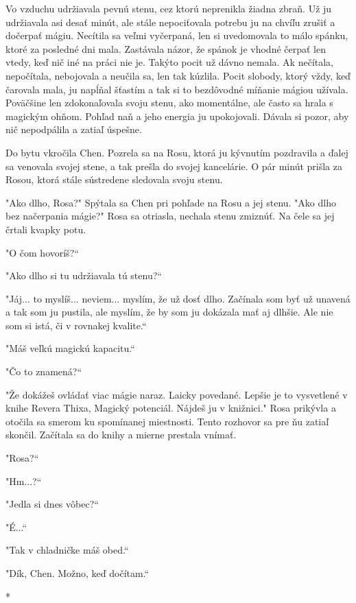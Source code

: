 \documentclass{book}
\begin{document}
Vo vzduchu udržiavala pevnú stenu, cez ktorú neprenikla žiadna zbraň. Už ju udržiavala asi desať minút, ale stále nepociťovala potrebu ju na chvíľu zrušiť a dočerpať mágiu. Necítila sa veľmi vyčerpaná, len si uvedomovala to málo spánku, ktoré za posledné dni mala. Zastávala názor, že spánok je vhodné čerpať len vtedy, keď nič iné na práci nie je. Takýto pocit už dávno nemala. Ak nečítala, nepočítala, nebojovala a neučila sa, len tak kúzlila. Pocit slobody, ktorý vždy, keď čarovala mala, ju napĺňal šťastím a tak si to bezdôvodné míňanie mágiou užívala. Poväčšine len zdokonaľovala svoju stenu, ako momentálne, ale často sa hrala s magickým ohňom. Pohľad naň a jeho energia ju upokojovali. Dávala si pozor, aby nič nepodpálila a zatiaľ úspešne.

Do bytu vkročila Chen. Pozrela sa na Rosu, ktorá ju kývnutím pozdravila a ďalej sa venovala svojej stene, a tak prešla do svojej kancelárie. O pár minút prišla za Rosou, ktorá stále sústredene sledovala svoju stenu.

"$ $Ako dlho, Rosa?"$ $ Spýtala sa Chen pri pohľade na Rosu a jej stenu. "$ $Ako dlho bez načerpania mágie?"$ $ Rosa sa otriasla, nechala stenu zmiznúť. Na čele sa jej črtali kvapky potu.

"$ $O čom hovoríš?“

"$ $Ako dlho si tu udržiavala tú stenu?“

"$ $Jáj... to myslíš... neviem... myslím, že už dosť dlho. Začínala som byť už unavená a tak som ju pustila, ale myslím, že by som ju dokázala mať aj dlhšie. Ale nie som si istá, či v rovnakej kvalite.“

"$ $Máš veľkú magickú kapacitu.“

"$ $Čo to znamená?“

"$ $Že dokážeš ovládať viac mágie naraz. Laicky povedané. Lepšie je to vysvetlené v knihe Revera Thixa, Magický potenciál. Nájdeš ju v knižnici."$ $ Rosa prikývla a otočila sa smerom ku spomínanej miestnosti. Tento rozhovor sa pre ňu zatiaľ skončil. Začítala sa do knihy a mierne prestala vnímať.

"$ $Rosa?“

"$ $Hm...?“

"$ $Jedla si dnes vôbec?“

"$ $É...“

"$ $Tak v chladničke máš obed.“

"$ $Dík, Chen. Možno, keď dočítam.“

\begin{center}
*
\end{center}
\end{document}
